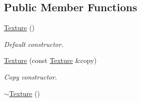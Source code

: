 \subsection*{Public Member Functions}
\begin{DoxyCompactItemize}
\item 
\hyperlink{classsf_1_1Texture_a3e04674853b8533bf981db3173e3a4a7}{Texture} ()
\begin{DoxyCompactList}\small\item\em Default constructor. \end{DoxyCompactList}\item 
\hyperlink{classsf_1_1Texture_a524855cbf89de3b74be84d385fd229de}{Texture} (const \hyperlink{classsf_1_1Texture}{Texture} \&copy)
\begin{DoxyCompactList}\small\item\em Copy constructor. \end{DoxyCompactList}\item 
\hypertarget{classsf_1_1Texture_a9c5354ad40eb1c5aeeeb21f57ccd7e6c}{\hyperlink{classsf_1_1Texture_a9c5354ad40eb1c5aeeeb21f57ccd7e6c}{$\sim$\-Texture} ()}\label{classsf_1_1Texture_a9c5354ad40eb1c5aeeeb21f57ccd7e6c}


\end{DoxyCompactItemize}
